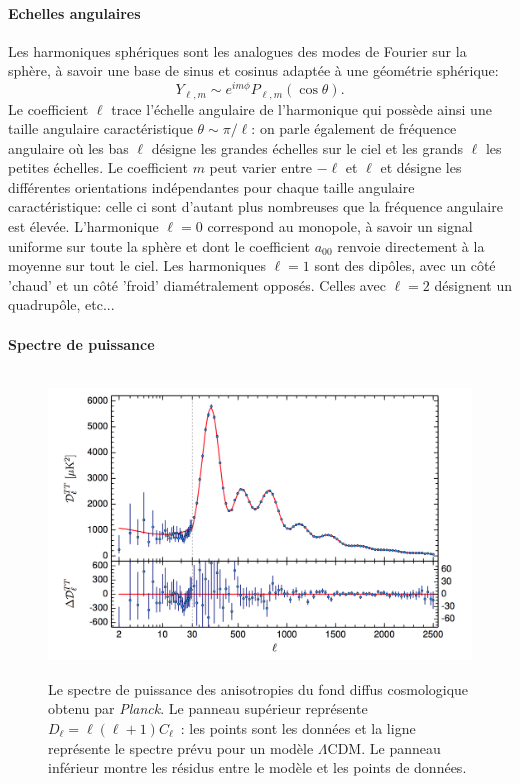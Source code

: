 \paragraph{Echelles angulaires}
 Les harmoniques sphériques sont les analogues des modes de Fourier sur la sphère, à savoir une base de sinus et cosinus adaptée à une géométrie sphérique:
\begin{equation}
Y_{\ell,m}\sim e^{im\phi} P_{\ell,m}(\cos \theta).
\end{equation} 
 Le coefficient $\ell$ trace l'échelle angulaire de l'harmonique qui possède ainsi une taille angulaire caractéristique $\theta\sim\pi/\ell$: on parle également de fréquence angulaire où les bas $\ell$ désigne les grandes échelles sur le ciel et les grands $\ell$ les petites échelles. Le coefficient $m$ peut varier entre $-\ell$ et $\ell$ et désigne les différentes orientations indépendantes pour chaque taille angulaire caractéristique: celle ci sont d'autant plus nombreuses que la fréquence angulaire est élevée. L'harmonique $\ell=0$ correspond au monopole, à savoir un signal uniforme sur toute la sphère et dont le coefficient $a_{00}$ renvoie directement à la moyenne sur tout le ciel. Les harmoniques $\ell=1$ sont des dipôles, avec un côté 'chaud' et un côté 'froid' diamétralement opposés. Celles avec $\ell=2$ désignent un quadrupôle, etc...

\paragraph{Spectre de puissance}
\begin{figure}[htbp]
	\centering
		\includegraphics[height=8cm]{figs/cl2015.png}
		\caption[Le spectre de puissance des anisotropies du fond diffus cosmologique obtenu par \textit{Planck}.]{Le spectre de puissance des anisotropies du fond diffus cosmologique obtenu par \textit{Planck}. Le panneau supérieur représente $D_\ell=\ell(\ell+1)C_\ell$~: les points sont les données et la ligne représente le spectre prévu pour un modèle $\Lambda$CDM. Le panneau inférieur montre les résidus entre le modèle et les points de données.}
	\label{f:cl}
\end{figure}

